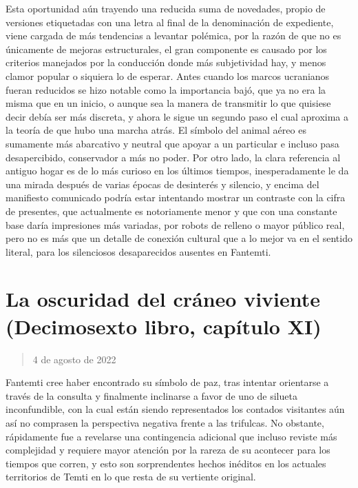 \documentclass[
]{book}
\begin{document}
Esta oportunidad aún trayendo una reducida suma de novedades, propio de versiones etiquetadas con una letra al final de la denominación de expediente, viene cargada de más tendencias a levantar polémica, por la razón de que no es únicamente de mejoras estructurales, el gran componente es causado por los criterios manejados por la conducción donde más subjetividad hay, y menos clamor popular o siquiera lo de esperar. Antes cuando los marcos ucranianos fueran reducidos se hizo notable como la importancia bajó, que ya no era la misma que en un inicio, o aunque sea la manera de transmitir lo que quisiese decir debía ser más discreta, y ahora le sigue un segundo paso el cual aproxima a la teoría de que hubo una marcha atrás. El símbolo del animal aéreo es sumamente más abarcativo y neutral que apoyar a un particular e incluso pasa desapercibido, conservador a más no poder. Por otro lado, la clara referencia al antiguo hogar es de lo más curioso en los últimos tiempos, inesperadamente le da una mirada después de varias épocas de desinterés y silencio, y encima del manifiesto comunicado podría estar intentando mostrar un contraste con la cifra de presentes, que actualmente es notoriamente menor y que con una constante base daría impresiones más variadas, por robots de relleno o mayor público real, pero no es más que un detalle de conexión cultural que a lo mejor va en el sentido literal, para los silenciosos desaparecidos ausentes en Fantemti.

\hypertarget{la-oscuridad-del-cruxe1neo-viviente-decimosexto-libro-capuxedtulo-xi}{%
\section{La oscuridad del cráneo viviente (Decimosexto libro, capítulo XI)}\label{la-oscuridad-del-cruxe1neo-viviente-decimosexto-libro-capuxedtulo-xi}}

\begin{quote}
4 de agosto de 2022
\end{quote}

Fantemti cree haber encontrado su símbolo de paz, tras intentar orientarse a través de la consulta y finalmente inclinarse a favor de uno de silueta inconfundible, con la cual están siendo representados los contados visitantes aún así no comprasen la perspectiva negativa frente a las trifulcas. No obstante, rápidamente fue a revelarse una contingencia adicional que incluso reviste más complejidad y requiere mayor atención por la rareza de su acontecer para los tiempos que corren, y esto son sorprendentes hechos inéditos en los actuales territorios de Temti en lo que resta de su vertiente original.
\end{document}
